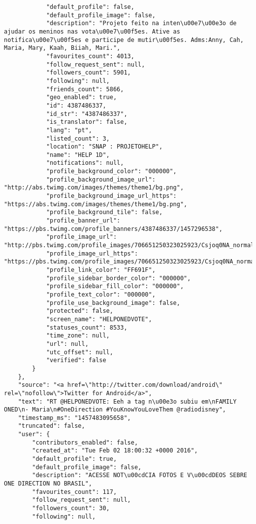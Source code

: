 \begin{lstlisting}
            "default_profile": false,
            "default_profile_image": false,
            "description": "Projeto feito na inten\u00e7\u00e3o de ajudar os meninos nas vota\u00e7\u00f5es. Ative as notifica\u00e7\u00f5es e participe de mutir\u00f5es. Adms:Anny, Cah, Maria, Mary, Kaah, Biiah, Mari.",
            "favourites_count": 4013,
            "follow_request_sent": null,
            "followers_count": 5901,
            "following": null,
            "friends_count": 5866,
            "geo_enabled": true,
            "id": 4387486337,
            "id_str": "4387486337",
            "is_translator": false,
            "lang": "pt",
            "listed_count": 3,
            "location": "SNAP : PROJETOHELP",
            "name": "HELP 1D",
            "notifications": null,
            "profile_background_color": "000000",
            "profile_background_image_url": "http://abs.twimg.com/images/themes/theme1/bg.png",
            "profile_background_image_url_https": "https://abs.twimg.com/images/themes/theme1/bg.png",
            "profile_background_tile": false,
            "profile_banner_url": "https://pbs.twimg.com/profile_banners/4387486337/1457296538",
            "profile_image_url": "http://pbs.twimg.com/profile_images/706651250323025923/Csjoq0NA_normal.jpg",
            "profile_image_url_https": "https://pbs.twimg.com/profile_images/706651250323025923/Csjoq0NA_normal.jpg",
            "profile_link_color": "FF691F",
            "profile_sidebar_border_color": "000000",
            "profile_sidebar_fill_color": "000000",
            "profile_text_color": "000000",
            "profile_use_background_image": false,
            "protected": false,
            "screen_name": "HELPONEDVOTE",
            "statuses_count": 8533,
            "time_zone": null,
            "url": null,
            "utc_offset": null,
            "verified": false
        }
    },
    "source": "<a href=\"http://twitter.com/download/android\" rel=\"nofollow\">Twitter for Android</a>",
    "text": "RT @HELPONEDVOTE: Eeh a tag n\u00e3o subiu em\nFAMILY ONED\n- Maria\n#OneDirection #YouKnowYouLoveThem @radiodisney",
    "timestamp_ms": "1457483095658",
    "truncated": false,
    "user": {
        "contributors_enabled": false,
        "created_at": "Tue Feb 02 18:00:32 +0000 2016",
        "default_profile": true,
        "default_profile_image": false,
        "description": "ACESSE NOT\u00cdCIA FOTOS E V\u00cdDEOS SEBRE ONE DIRECTION NO BRASIL",
        "favourites_count": 117,
        "follow_request_sent": null,
        "followers_count": 30,
        "following": null,

\end{lstlisting}

